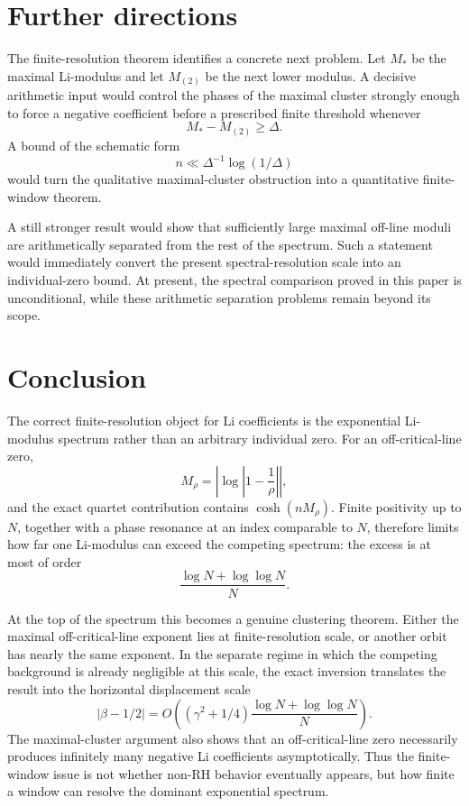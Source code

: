 \documentclass[11pt]{article}
\begin{document}
\section{Further directions}

The finite-resolution theorem identifies a concrete next problem. Let \(M_*\) be the maximal Li-modulus and let \(M_{(2)}\) be the next lower modulus. A decisive arithmetic input would control the phases of the maximal cluster strongly enough to force a negative coefficient before a prescribed finite threshold whenever
\[
M_*-M_{(2)}\ge\Delta.
\]
A bound of the schematic form
\[
n\ll \Delta^{-1}\log(1/\Delta)
\]
would turn the qualitative maximal-cluster obstruction into a quantitative finite-window theorem.

A still stronger result would show that sufficiently large maximal off-line moduli are arithmetically separated from the rest of the spectrum. Such a statement would immediately convert the present spectral-resolution scale into an individual-zero bound. At present, the spectral comparison proved in this paper is unconditional, while these arithmetic separation problems remain beyond its scope.

\section{Conclusion}

The correct finite-resolution object for Li coefficients is the exponential Li-modulus spectrum rather than an arbitrary individual zero. For an off-critical-line zero,
\[
M_\rho=\left|\log\left|1-\frac1\rho\right|\right|,
\]
and the exact quartet contribution contains \(\cosh(nM_\rho)\). Finite positivity up to \(N\), together with a phase resonance at an index comparable to \(N\), therefore limits how far one Li-modulus can exceed the competing spectrum: the excess is at most of order
\[
\frac{\log N+\log\log N}{N}.
\]

At the top of the spectrum this becomes a genuine clustering theorem. Either the maximal off-critical-line exponent lies at finite-resolution scale, or another orbit has nearly the same exponent. In the separate regime in which the competing background is already negligible at this scale, the exact inversion translates the result into the horizontal displacement scale
\[
|\beta-1/2|
=O\!\left((\gamma^2+1/4)\frac{\log N+\log\log N}{N}\right).
\]
The maximal-cluster argument also shows that an off-critical-line zero necessarily produces infinitely many negative Li coefficients asymptotically. Thus the finite-window issue is not whether non-RH behavior eventually appears, but how finite a window can resolve the dominant exponential spectrum.
\end{document}
